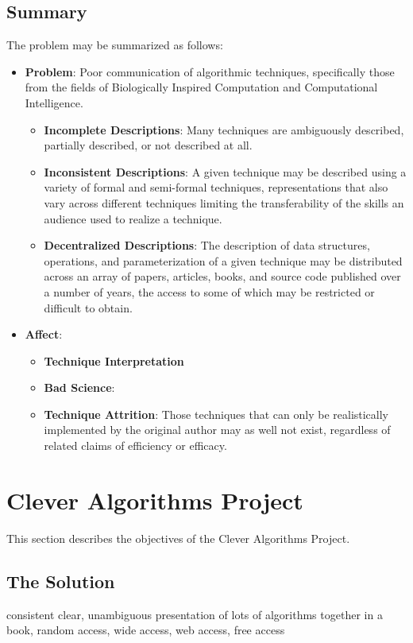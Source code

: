 \documentclass[a4paper, 11pt]{article}
\begin{document}
\subsection{Summary}
The problem may be summarized as follows:
\begin{itemize}
	\item \textbf{Problem}: Poor communication of algorithmic techniques, specifically those from the fields of Biologically Inspired Computation and Computational Intelligence.
	\begin{itemize}
		\item \textbf{Incomplete Descriptions}: Many techniques are ambiguously described, partially described, or not described at all.
		\item \textbf{Inconsistent Descriptions}: A given technique may be described using a variety of formal and semi-formal techniques, representations that also vary across different techniques limiting the transferability of the skills an audience used to realize a technique.
		\item \textbf{Decentralized Descriptions}: The description of data structures, operations, and parameterization of a given technique may be distributed across an array of papers, articles, books, and source code published over a number of years, the access to some of which may be restricted or difficult to obtain. 
	\end{itemize}
	\item \textbf{Affect}: 
	\begin{itemize}
		\item \textbf{Technique Interpretation}
		\item \textbf{Bad Science}: 
		\item \textbf{Technique Attrition}: Those techniques that can only be realistically implemented by the original author may as well not exist, regardless of related claims of efficiency or efficacy.
	\end{itemize}
\end{itemize}

\section{Clever Algorithms Project}
This section describes the objectives of the Clever Algorithms Project.

\subsection{The Solution}
consistent clear, unambiguous presentation of lots of algorithms together
in a book, random access, wide access, web access, free access
\end{document}
